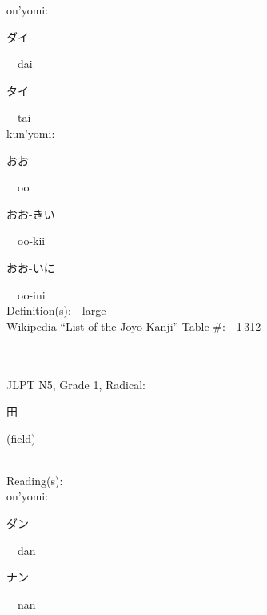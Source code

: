 \begin{multicols}{2}
{\hspace*{1em}}on'yomi:\ \ \\
{\hspace*{2em}}{\begin{CJK}{UTF8}{min} ダイ \end{CJK}}\ \ dai\ \ \\
{\hspace*{2em}}{\begin{CJK}{UTF8}{min} タイ \end{CJK}}\ \ tai\ \ \\
{\hspace*{1em}}kun'yomi:\ \ \\
{\hspace*{2em}}{\begin{CJK}{UTF8}{min} おお \end{CJK}}\ \ oo\ \ \\
{\hspace*{2em}}{\begin{CJK}{UTF8}{min} おお-きい \end{CJK}}\ \ oo-kii\ \ \\
{\hspace*{2em}}{\begin{CJK}{UTF8}{min} おお-いに \end{CJK}}\ \ oo-ini\ \ \\
Definition(s):\ \ large \\
Wikipedia ``List of the J\=oy\=o Kanji'' Table \#:\ \ 1\,312 \\
\ \ \\
{\fontsize{34pt}{40pt}  }\ \ \\  %
{JLPT N5, Grade 1, Radical:\ \ {\begin{CJK}{UTF8}{min} 田 \end{CJK}} (field) } \\
Reading(s):\ \ \\
{\hspace*{1em}}on'yomi:\ \ \\
{\hspace*{2em}}{\begin{CJK}{UTF8}{min} ダン \end{CJK}}\ \ dan\ \ \\
{\hspace*{2em}}{\begin{CJK}{UTF8}{min} ナン \end{CJK}}\ \ nan\ \ \\

\end{multicols}

